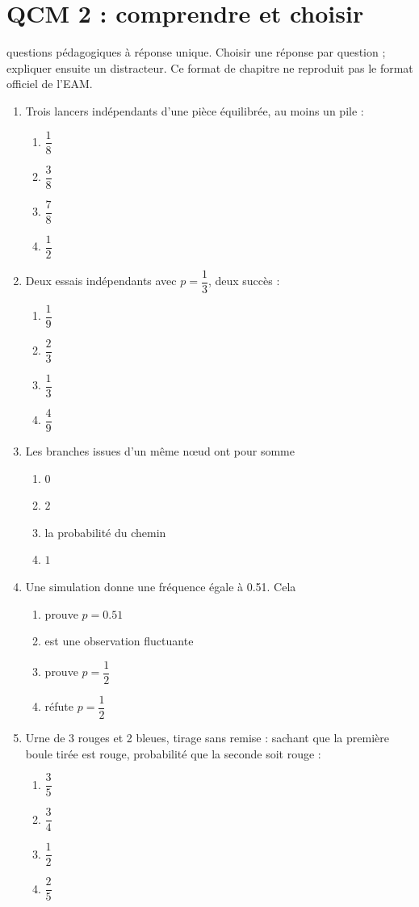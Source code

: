 \endgroup
\begingroup\small
{}\section*{QCM 2 : comprendre et choisir}\label{C05-Q2}
 questions pédagogiques à réponse unique. Choisir une réponse par question ; expliquer ensuite un distracteur. Ce format de chapitre ne reproduit pas le format officiel de l’EAM.
\begin{enumerate}
\item Trois lancers indépendants d’une pièce équilibrée, au moins un pile :
\begin{enumerate}[label=\Alph*.,itemsep=2pt]
\item $\dfrac{1}{8}$
\item $\dfrac{3}{8}$
\item $\dfrac{7}{8}$
\item $\dfrac{1}{2}$
\end{enumerate}
\item Deux essais indépendants avec $p=\dfrac{1}{3}$, deux succès :
\begin{enumerate}[label=\Alph*.,itemsep=2pt]
\item $\dfrac{1}{9}$
\item $\dfrac{2}{3}$
\item $\dfrac{1}{3}$
\item $\dfrac{4}{9}$
\end{enumerate}
\item Les branches issues d’un même nœud ont pour somme
\begin{enumerate}[label=\Alph*.,itemsep=2pt]
\item $0$
\item $2$
\item la probabilité du chemin
\item $1$
\end{enumerate}
\item Une simulation donne une fréquence égale à \num{0,51}. Cela
\begin{enumerate}[label=\Alph*.,itemsep=2pt]
\item prouve $p=\num{0,51}$
\item est une observation fluctuante
\item prouve $p=\dfrac{1}{2}$
\item réfute $p=\dfrac{1}{2}$
\end{enumerate}
\item Urne de 3 rouges et 2 bleues, tirage sans remise : sachant que la première boule tirée est rouge, probabilité que la seconde soit rouge :
\begin{enumerate}[label=\Alph*.,itemsep=2pt]
\item $\dfrac{3}{5}$
\item $\dfrac{3}{4}$
\item $\dfrac{1}{2}$
\item $\dfrac{2}{5}$
\end{enumerate}
\end{enumerate}
